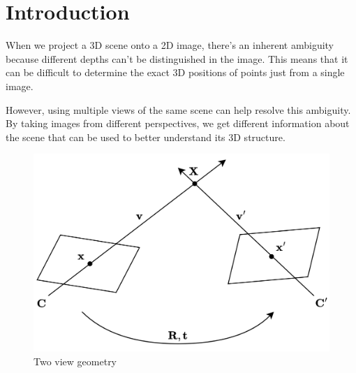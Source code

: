 \section{Introduction}

When we project a 3D scene onto a 2D image, there's an inherent ambiguity because different depths can't be distinguished in the image. 
This means that it can be difficult to determine the exact 3D positions of points just from a single image.

However, using multiple views of the same scene can help resolve this ambiguity. 
By taking images from different perspectives, we get different information about the scene that can be used to better understand its 3D structure.
\begin{figure}[H]
    \centering
    \includegraphics[width=0.5\linewidth]{images/tvg.png}
    \caption{Two view geometry}
\end{figure}

